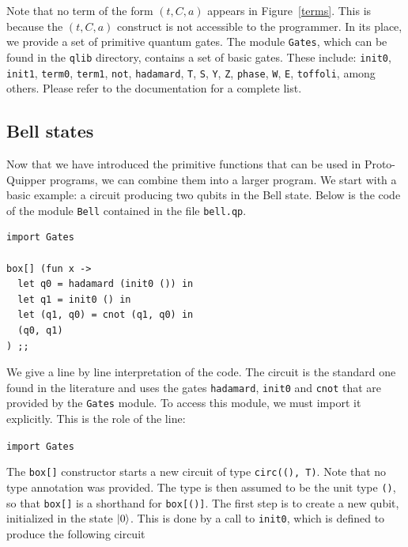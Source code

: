 Note that no term of the form $(t,C,a)$ appears in
Figure~\hyperref[terms]{\ref*{terms}}. This is because the $(t,C,a)$
construct is
not accessible to the programmer. In its place, we provide a set of 
primitive quantum gates. The module \verb#Gates#, which can be found in the 
\verb#qlib# directory, contains a set of basic gates. 
These include: \verb#init0#, \verb#init1#, \verb#term0#, \verb#term1#, 
\verb#not#, \verb#hadamard#, \verb#T#, \verb#S#, \verb#Y#, \verb#Z#, 
\verb#phase#, \verb#W#, \verb#E#, \verb#toffoli#, among others. Please
refer to the documentation for a complete list.

\subsection{Bell states}
\label{ssec-quipper-by-e}

Now that we have introduced the primitive functions that can be used in Proto-Quipper programs, we can combine them into a larger program. We start with 
a basic example: a circuit producing two qubits in the Bell state. Below is
the code of the module \verb#Bell# contained in the file \verb#bell.qp#.

\begin{splitcode}
\begin{verbatim}
import Gates

box[] (fun x ->
  let q0 = hadamard (init0 ()) in
  let q1 = init0 () in
  let (q1, q0) = cnot (q1, q0) in
  (q0, q1)
) ;;
\end{verbatim}
  \split {}
\end{splitcode}


We give a line by line interpretation of the code. The circuit is the standard one found in the literature and uses the gates \verb#hadamard#, 
\verb#init0# and \verb#cnot# that are provided by the \verb#Gates# module. 
To access this module, we must import it explicitly. This is the role of 
the line:
\begin{center}
  \verb#import Gates#
\end{center}
The \verb#box[]# constructor starts a new circuit of type \verb#circ((), T)#. 
Note that no type annotation was provided. The type is then assumed to be 
the unit type \verb#()#, so that \verb#box[]# is a shorthand for 
\verb#box[()]#. The first step is to create a new qubit, initialized in the 
state ${\left\vert{0}\right\rangle}$. This is done by a call to \verb#init0#, which is
defined to produce the following circuit


